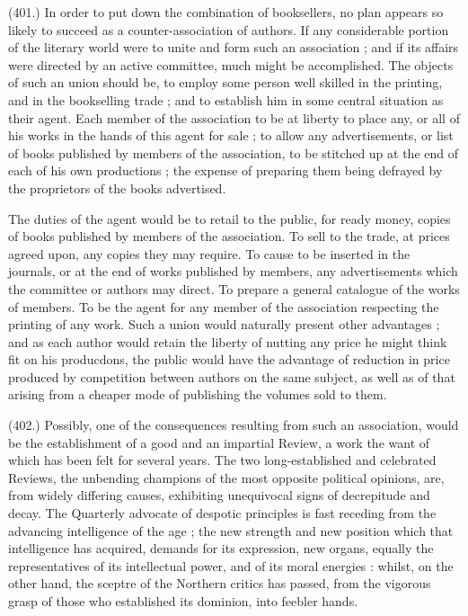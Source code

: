 \documentclass{article}
\begin{document}
(401.) In order to put down the combination of booksellers, no plan appears so likely to succeed as a counter-association of authors. If any considerable portion of the literary world were to unite and form such an association ; and if its affairs were directed by an active committee, much might be accomplished. The objects of such an union should be, to employ some person well skilled in the printing, and in the bookselling trade ; and to establish him in some central situation as their agent. Each member of the association to be at liberty to place any, or all of his works in the hands of this agent for sale ; to allow any advertisements, or list of books published by members of the association, to be stitched up at the end of each of his own productions ; the expense of preparing them being defrayed by the proprietors of the books advertised.


The duties of the agent would be to retail to the public, for ready money, copies of books published by members of the association. To sell to the trade, at prices agreed upon, any copies they may require. To cause to be inserted in the journals, or at the end of works published by members, any advertisements which the committee or authors may direct. To prepare a general catalogue of the works of members. To be the agent for any member of the association respecting the printing of any work. Such a union would naturally present other advantages ; and as each author would retain the liberty of nutting any price he might think fit on his producdons, the public would have the advantage of reduction in price produced by competition between authors on the same subject, as well as of that arising from a cheaper mode of publishing the volumes sold to them.


(402.) Possibly, one of the consequences resulting from such an association, would be the establishment of a good and an impartial Review, a work the want of which has been felt for several years. The two long-established and celebrated Reviews, the unbending champions of the most opposite political opinions, are, from widely differing causes, exhibiting unequivocal signs of decrepitude and decay. The Quarterly advocate of despotic principles is fast receding from the advancing intelligence of the age ; the new strength and new position which that intelligence has acquired, demands for its expression, new organs, equally the representatives of its intellectual power, and of its moral energies : whilst, on the other hand, the sceptre of the Northern critics has passed, from the vigorous grasp of those who established its dominion, into feebler hands.
\end{document}
